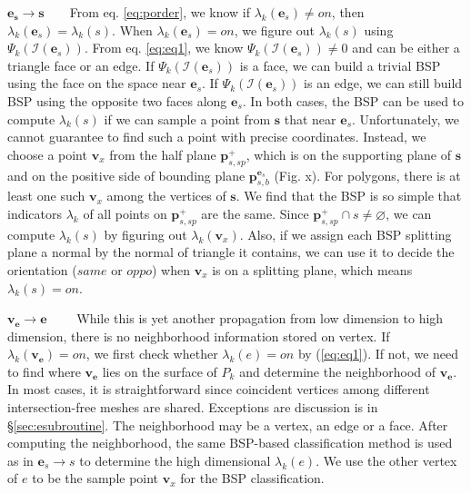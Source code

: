 \documentclass[10pt,journal,compsoc]{IEEEtran}
\begin{document}
\vspace{0.5em}
\noindent\textbf{$\bm{\bm{e}_s\to s}$}~~~~From eq. \ref{eq:porder}, we know if $\lambda_k(\bm{e}_s) \neq on$, then $\lambda_k(\bm{e}_s)=\lambda_k(s)$. When $\lambda_k(\bm{e}_s) = on$, we figure out $\lambda_k(s)$ using $\Psi_k(\bm{\mathcal{I}}(\bm{e}_s))$. From eq. \ref{eq:eq1}, we know $\Psi_k(\bm{\mathcal{I}}(\bm{e}_s)) \neq 0$ and can be either a triangle face or an edge. If $\Psi_k(\bm{\mathcal{I}}(\bm{e}_s))$ is a face, we can build a trivial BSP \cite{thibault1987set} using the face on the space near $\bm{e}_s$. If $\Psi_k(\bm{\mathcal{I}}(\bm{e}_s))$ is an edge, we can still build BSP using the opposite two faces along $\bm{e}_s$. In both cases, the BSP can be used to compute $\lambda_k(s)$ if we can sample a point from $\bm{s}$ that near $\bm{e}_s$. Unfortunately, we cannot guarantee to find such a point with precise coordinates. Instead, we choose a point $\bm{v}_x$ from the half plane $\bm{p}_{s, sp}^+$, which is on the supporting plane of $\bm{s}$ and on the positive side of bounding plane $\bm{p}_{s, b}^{\bm{e}_s}$ (Fig. x). For polygons, there is at least one such $\bm{v}_x$ among the vertices of $\bm{s}$. We find that the BSP is so simple that indicators $\lambda_k$ of all points on $\bm{p}_{s, sp}^+$ are the same. Since $\bm{p}_{s, sp}^+ \cap s \neq \varnothing$, we can compute $\lambda_k(s)$ by figuring out $\lambda_k(\bm{v}_x)$. Also, if we assign each BSP splitting plane a normal by the normal of triangle it contains, we can use it to decide the orientation ($same$ or $oppo$) when $\bm{v}_x$ is on a splitting plane, which means $\lambda_k(s)=on$.

\vspace{0.5em}
\noindent\textbf{$\bm{\bm{v}_{\bm{e}}\to e}$}~~~~ While this is yet another propagation from low dimension to high dimension, there is no neighborhood information stored on vertex. If $\lambda_k(\bm{v}_{\bm{e}})=on$, we first check whether $\lambda_k(e) = on$ by (\ref{eq:eq1}). If not, we need to find where $\bm{v}_{\bm{e}}$ lies on the surface of $P_k$ and determine the neighborhood of $\bm{v}_{\bm{e}}$. In most cases, it is straightforward since coincident vertices among different intersection-free meshes are shared. Exceptions are discussion is in \S\ref{sec:esubroutine}. The neighborhood may be a vertex, an edge or a face. After computing the neighborhood, the same BSP-based classification method is used as in ${\bm{e}_s\to s}$ to determine the high dimensional $\lambda_k(e)$. We use the other vertex of $e$ to be the sample point $\bm{v}_x$ for the BSP classification.
\end{document}
